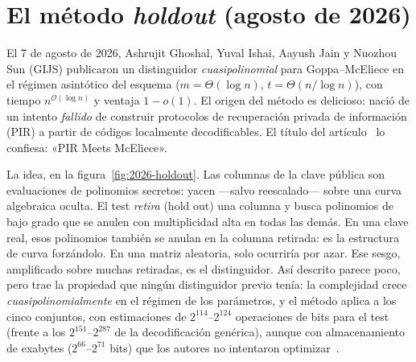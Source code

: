 \documentclass[11pt,a4paper,oneside]{report}
\begin{document}
\section{El método \emph{holdout} (agosto de 2026)}\label{sec:2026-holdout}

El 7 de agosto de 2026, Ashrujit Ghoshal, Yuval Ishai, Aayush Jain y
Nuozhou Sun (GIJS) publicaron un distinguidor \emph{cuasipolinomial}
para Goppa--McEliece en el régimen asintótico del esquema
($m=\Theta(\log n)$, $t=\Theta(n/\log n)$), con tiempo
$n^{\mathcal{O}(\log n)}$ y ventaja $1-o(1)$. El origen del método
es delicioso: nació de un intento \emph{fallido} de construir
protocolos de recuperación privada de información (PIR) a partir de
códigos localmente decodificables. El título del
artículo~\cite{ghoshal2026} lo confiesa: «PIR Meets McEliece».

La idea, en la figura~\ref{fig:2026-holdout}. Las columnas de la
clave pública son evaluaciones de polinomios secretos: yacen
---salvo reescalado--- sobre una curva algebraica oculta. El test
\emph{retira} (hold out) una columna y busca polinomios de bajo
grado que se anulen con multiplicidad alta en todas las demás. En
una clave real, esos polinomios también se anulan en la columna
retirada: es la estructura de curva forzándolo. En una matriz
aleatoria, solo ocurriría por azar. Ese sesgo, amplificado sobre
muchas retiradas, es el distinguidor. Así descrito parece poco,
pero trae la propiedad que ningún distinguidor previo tenía: la
complejidad crece \emph{cuasipolinomialmente} en el régimen de los
parámetros, y el método aplica a los cinco conjuntos, con
estimaciones de $2^{114}$--$2^{124}$ operaciones de bits para el
test (frente a los $2^{151}$--$2^{287}$ de la decodificación
genérica), aunque con almacenamiento de exabytes ($2^{66}$--$2^{71}$
bits) que los autores no intentaron optimizar~\cite{ghoshal2026}.
\end{document}
